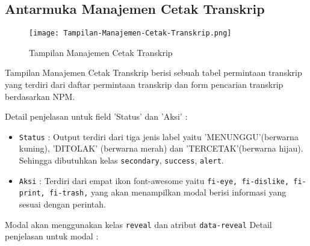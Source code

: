 \subsection{Antarmuka Manajemen Cetak Transkrip}
\begin{figure} [H]
	\centering  
	\texttt{[image: Tampilan-Manajemen-Cetak-Transkrip.png]}  
	\caption{Tampilan Manajemen Cetak Transkrip} 	
\end{figure}

Tampilan Manajemen Cetak Transkrip berisi sebuah tabel permintaan transkrip yang terdiri dari daftar permintaan transkrip dan form pencarian transkrip berdasarkan NPM. \par

\noindent Detail penjelasan untuk field 'Status' dan 'Aksi' :
\begin{itemize}
	\item \texttt{Status} : Output terdiri dari tiga jenis label yaitu 'MENUNGGU'(berwarna kuning), 'DITOLAK' (berwarna merah) dan 'TERCETAK'(berwarna hijau).  Sehingga dibutuhkan kelas \verb|secondary|, \verb|success|, \verb|alert|. 
	\item \texttt{Aksi} : Terdiri dari empat ikon font-awesome yaitu \verb|fi-eye, fi-dislike, fi-print, fi-trash,| yang akan menampilkan modal berisi informasi yang sesuai dengan perintah.
\end{itemize}
Modal akan menggunakan kelas \texttt{reveal} dan atribut \texttt{data-reveal} Detail penjelasan untuk modal : 

